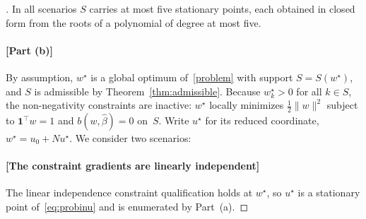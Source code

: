 \documentclass[11pt]{article}
\begin{document}
\begin{proof}[]
In all scenarios $S$ carries at most five stationary points, each obtained in closed form from the roots of a polynomial of degree at most five.

\paragraph{[Part (b)]}
By assumption, $w^\star$ is a global optimum of~\eqref{problem} with support $S=S(w^\star)$, and $S$ is admissible by Theorem~\ref{thm:admissible}. Because $w^\star_k > 0$ for all $k \in S$, the non-negativity constraints are inactive: $w^\star$ locally minimizes $\tfrac12\|w\|^2$ subject to $\mathbf 1^\top w = 1$ and $b(w,\hat\beta)=0$ on~$S$. Write $u^\star$ for its reduced coordinate, $w^\star = u_0 + Nu^\star$. We consider two scenarios:

\paragraph{[The constraint gradients are linearly independent]} The linear independence constraint qualification holds at $w^\star$, so $u^\star$ is a stationary point of~\eqref{eq:probinu} and is enumerated by Part~(a).


\end{proof}
\end{document}
